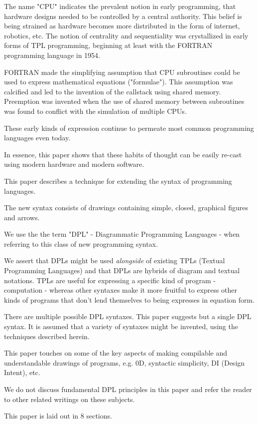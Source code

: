 \documentclass[10pt,anonymous,review]{acmart}
\begin{document}
The name "CPU" indicates the prevalent notion in early programming, that
hardware designs needed to be controlled by a central authority. This
belief is being strained as hardware becomes more distributed in the
form of internet, robotics, etc. The notion of centrality and
sequentiality was crystallized in early forms of TPL programming,
beginning at least with the FORTRAN\cite{fortran} programming language in 1954.

FORTRAN made the simplifying assumption that CPU subroutines could be
used to express mathematical equations ("formulae"). This assumption was
calcified and led to the invention of the callstack using shared memory.
Preemption was invented when the use of shared memory between
subroutines was found to conflict with the simulation of multiple CPUs.

These early kinds of expression continue to permeate most common
programming languages even today.

In essence, this paper shows that these habits of thought can be easily
re-cast using modern hardware and modern software.

This paper describes a technique for extending the syntax of programming
languages.

The new syntax consists of drawings containing simple, closed, graphical
figures and arrows.

We use the the term "DPL" - Diagrammatic Programming Languages - when
referring to this class of new programming syntax.

We assert that DPLs might be used \emph{alongside} of existing TPLs (Textual
Programming Languages) and that DPLs are hybrids of diagram and textual
notations. TPLs are useful for expressing a specific kind of program -
computation - whereas other syntaxes make it more fruitful to express
other kinds of programs that don't lend themselves to being expresses in
equation form.

There are multiple possible DPL syntaxes. This paper suggests but a
single DPL syntax. It is assumed that a variety of syntaxes might be
invented, using the techniques described herein.

This paper touches on some of the key aspects of making compilable and
understandable drawings of programs, e.g. 0D, syntactic simplicity, DI
(Design Intent), etc.

We do not discuss fundamental DPL principles in this paper and refer the
reader to other related writings on these subjects.

This paper is laid out in 8 sections.
\end{document}
